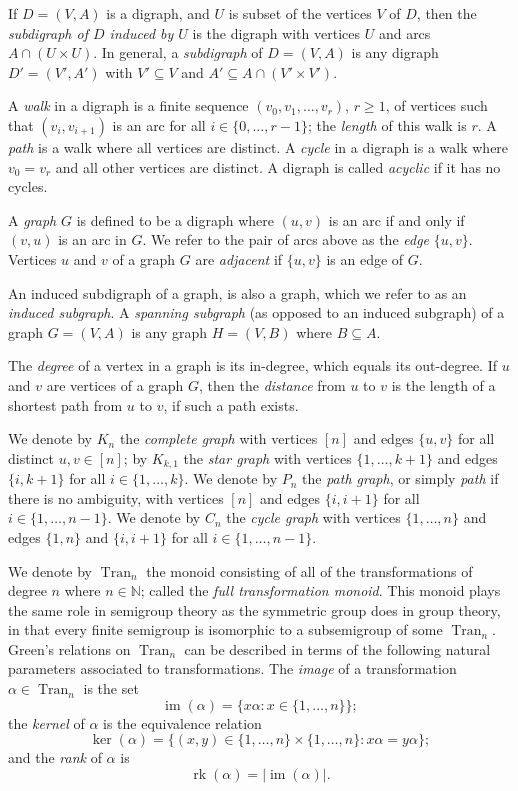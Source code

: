 \documentclass[10pt]{amsart}
\newcommand{\N}{\mathbb{N}}
\DeclareMathOperator{\im}{im}
\DeclareMathOperator{\Tran}{Tran}
\DeclareMathOperator{\rk}{rk}
\newcommand{\set}[2]{\{#1:#2\}}
\newcommand{\nset}{[n]}
\begin{document}
If $D = (V, A)$ is a digraph, and $U$ is subset of the vertices $V$ of $D$,
then the \emph{subdigraph of $D$ induced by $U$} is the digraph with vertices
$U$ and arcs $A \cap (U\times U)$. In general, a \emph{subdigraph} of $D =
(V,A)$ is any digraph $D' = (V', A')$ with $V' \subseteq V$ and $A' \subseteq
A\cap (V' \times V')$.

A \emph{walk} in a digraph is a finite sequence $(v_0, v_1, \ldots,
v_r)$, $r\geq 1$, of vertices such that $(v_i, v_{i + 1})$ is an arc for all
$i\in \{0, \ldots, r - 1\}$; the \emph{length} of this walk is $r$. A
\emph{path} is a walk where all vertices are distinct. A \emph{cycle} in a
digraph is a walk where $v_0 = v_r$ and all other vertices are distinct.
A digraph is called \emph{acyclic} if it has no cycles.

A \emph{graph} $G$ is defined to be a digraph where $(u, v)$ is an arc if and
only if $(v, u)$ is an arc in $G$. We refer to the pair of arcs above as the
\emph{edge} $\{u, v\}$. Vertices $u$ and $v$ of a graph $G$ are
\emph{adjacent} if $\{u, v\}$ is an edge of $G$. 

An induced subdigraph of a graph, is also a graph, which we refer to as an
\emph{induced subgraph}. A \emph{spanning subgraph} (as opposed to an
induced subgraph) of a graph $G = (V, A)$ is any graph $H = (V, B)$ where $B
\subseteq A$. 

The \emph{degree} of a vertex in a graph is its in-degree, which equals
its out-degree. If $u$ and $v$ are vertices of a graph $G$, then the
\emph{distance} from $u$ to $v$ is the length of a shortest path from $u$ to
$v$, if such a path exists.

We denote by $K_n$ the \emph{complete graph} with vertices $\nset$
and edges $\{u,v\}$ for all distinct $u,v \in \nset$; by $K_{k, 1}$
the \emph{star graph} with vertices $\{1, \ldots, k + 1\}$ and edges
$\{i, k + 1\}$ for all $i \in \{1, \ldots, k\}$. We denote by $P_n$ the
\emph{path graph}, or simply \emph{path} if there is no ambiguity, with vertices
$\nset$ and edges $\{i, i + 1\}$ for all $i \in \{1, \ldots, n-
1\}$. We denote by $C_n$ the \emph{cycle graph} with vertices $\{1, \ldots,
n\}$ and edges $\{1, n\}$ and $\{i, i + 1\}$ for all $i \in \{1, \ldots, n-
1\}$.

We denote by $\Tran_n$ the monoid consisting of all of the transformations of
degree $n$ where $n\in \N$; called the \emph{full transformation monoid}.
This monoid plays the same role in semigroup theory as the symmetric group does
in group theory, in that every finite semigroup is isomorphic to a subsemigroup
of some $\Tran_n$. Green's relations on $\Tran_n$ can be described in terms of
the following natural parameters associated to transformations. The
\emph{image} of a transformation $\alpha\in \Tran_n$ is the set
\[\im(\alpha)=\set{x\alpha}{x\in\{1, \ldots, n\}};\]
the \emph{kernel} of $\alpha$ is the equivalence relation
\[\ker(\alpha)=\set{(x,y)\in\{1, \ldots, n\}\times\{1, \ldots,
n\}}{x\alpha=y\alpha};\]
and the \emph{rank} of $\alpha$ is
\[\rk(\alpha)=|\im(\alpha)|.\]
\end{document}
